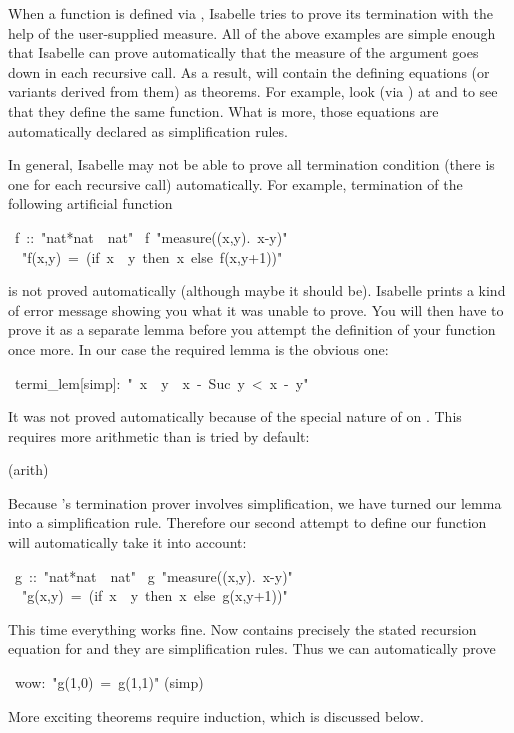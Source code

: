 \begin{isabelle}%
%
\begin{isamarkuptext}%
When a function is defined via , Isabelle tries to prove
its termination with the help of the user-supplied measure.  All of the above
examples are simple enough that Isabelle can prove automatically that the
measure of the argument goes down in each recursive call. As a result,
 will contain the defining equations (or variants derived from
them) as theorems. For example, look (via ) at
 and  to see that they define the same
function. What is more, those equations are automatically declared as
simplification rules.

In general, Isabelle may not be able to prove all termination condition
(there is one for each recursive call) automatically. For example,
termination of the following artificial function%
\end{isamarkuptext}%
\ f\ ::\ {"}nat*nat\ {\isasymRightarrow}\ nat{"}\isanewline
{}\ f\ {"}measure({\isasymlambda}(x,y).\ x-y){"}\isanewline
\ \ {"}f(x,y)\ =\ (if\ x\ {\isasymle}\ y\ then\ x\ else\ f(x,y+1)){"}%
\begin{isamarkuptext}%
\noindent
is not proved automatically (although maybe it should be). Isabelle prints a
kind of error message showing you what it was unable to prove. You will then
have to prove it as a separate lemma before you attempt the definition
of your function once more. In our case the required lemma is the obvious one:%
\end{isamarkuptext}%
\ termi\_lem[simp]:\ {"}{\isasymnot}\ x\ {\isasymle}\ y\ {\isasymLongrightarrow}\ x\ -\ Suc\ y\ <\ x\ -\ y{"}%
\begin{isamarkuptxt}%
\noindent
It was not proved automatically because of the special nature of \isa{-}
on . This requires more arithmetic than is tried by default:%
\end{isamarkuptxt}%
(arith)%
\begin{isamarkuptext}%
\noindent
Because 's termination prover involves simplification,
we have turned our lemma into a simplification rule. Therefore our second
attempt to define our function will automatically take it into account:%
\end{isamarkuptext}%
\ g\ ::\ {"}nat*nat\ {\isasymRightarrow}\ nat{"}\isanewline
{}\ g\ {"}measure({\isasymlambda}(x,y).\ x-y){"}\isanewline
\ \ {"}g(x,y)\ =\ (if\ x\ {\isasymle}\ y\ then\ x\ else\ g(x,y+1)){"}%
\begin{isamarkuptext}%
\noindent
This time everything works fine. Now  contains precisely the
stated recursion equation for  and they are simplification
rules. Thus we can automatically prove%
\end{isamarkuptext}%
\ wow:\ {"}g(1,0)\ =\ g(1,1){"}\isanewline
{}(simp)%
\begin{isamarkuptext}%
\noindent
More exciting theorems require induction, which is discussed below.


\end{isamarkuptext}
\end{isabelle}
